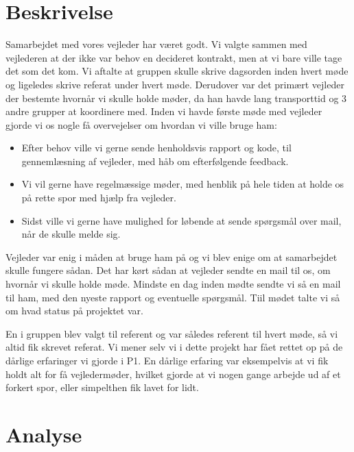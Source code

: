 \section{Beskrivelse}
Samarbejdet med vores vejleder har været godt. Vi valgte sammen med vejlederen at der ikke var behov en decideret kontrakt, men at vi bare ville tage det som det kom. Vi aftalte at gruppen skulle skrive dagsorden inden hvert møde og ligeledes skrive referat under hvert møde. Derudover var det primært vejleder der bestemte hvornår vi skulle holde møder, da han havde lang transporttid og 3 andre grupper at koordinere med. Inden vi havde første møde med vejleder gjorde vi os nogle få overvejelser om hvordan vi ville bruge ham:
\begin{itemize}
\item	Efter behov ville vi gerne sende henholdsvis rapport og kode, til gennemlæsning af vejleder, med håb om efterfølgende feedback.

\item	Vi vil gerne have regelmæssige møder, med henblik på hele tiden at holde os på rette spor med hjælp fra vejleder.

\item	Sidst ville vi gerne have mulighed for løbende at sende spørgsmål over mail, når de skulle melde sig.
\end{itemize}
Vejleder var enig i måden at bruge ham på og vi blev enige om at samarbejdet skulle fungere sådan. Det har kørt sådan at vejleder sendte en mail til os, om hvornår vi skulle holde møde. Mindste en dag inden mødte sendte vi så en mail til ham, med den nyeste rapport og eventuelle spørgsmål. Tiil mødet talte vi så om hvad status på projektet var. 

En i gruppen blev valgt til referent og var således referent til hvert møde, så vi altid fik skrevet referat. Vi mener selv vi i dette projekt har fået rettet op på de dårlige erfaringer vi gjorde i P1. En dårlige erfaring var eksempelvis at vi fik holdt alt for få vejledermøder, hvilket gjorde at vi nogen gange arbejde ud af et forkert spor, eller simpelthen fik lavet for lidt. 

\section{Analyse}

